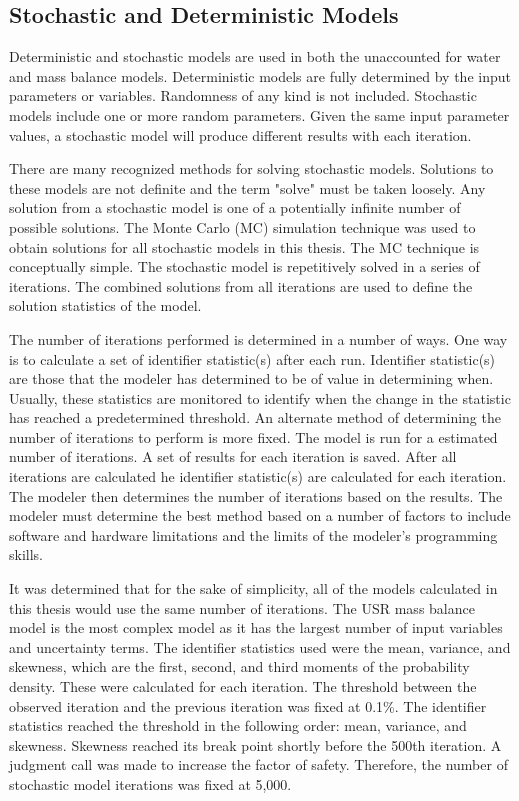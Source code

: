 \begin{linenumbers}
\clearpage{}
\section{Stochastic and Deterministic Models}
\label{sec:StochAndDetermModels}

Deterministic and stochastic models are used in both the unaccounted for water and mass balance models.  Deterministic models are fully determined by the input parameters or variables.  Randomness of any kind is not included.  Stochastic models include one or more random parameters.  Given the same input parameter values, a stochastic model will produce different results with each iteration.

There are many recognized methods for solving stochastic models.  Solutions to these models are not definite and the term "solve" must be taken loosely.  Any solution from a stochastic model is one of a potentially infinite number of possible solutions.  The Monte Carlo (MC) simulation technique was used to obtain solutions for all stochastic models in this thesis.  The MC technique is conceptually simple.  The stochastic model is repetitively solved in a series of iterations.  The combined solutions from all iterations are used to define the solution statistics of the model.  

The number of iterations performed is determined in a number of ways.  One way is to calculate a set of identifier statistic(s) after each run.  Identifier statistic(s) are those that the modeler has determined to be of value in determining when.  Usually, these statistics are monitored to identify when the change in the statistic has reached a predetermined threshold.  An alternate method of determining the number of iterations to perform is more fixed.  The model is run for a estimated number of iterations.  A set of results for each iteration is saved.  After all iterations are calculated he identifier statistic(s) are calculated for each iteration.  The modeler then determines the number of iterations based on the results.  The modeler must determine the best method based on a number of factors to include software and hardware limitations and the limits of the modeler's programming skills.

It was determined that for the sake of simplicity, all of the models calculated in this thesis would use the same number of iterations.  The USR mass balance model is the most complex model as it has the largest number of input variables and uncertainty terms.  The identifier statistics used were the mean, variance, and skewness, which are the first, second, and third moments of the probability density.  These were calculated for each iteration.  The threshold between the observed iteration and the previous iteration was fixed at 0.1\%.  The identifier statistics reached the threshold in the following order: mean, variance, and skewness.  Skewness reached its break point shortly before the 500th iteration.  A judgment call was made to increase the factor of safety.  Therefore, the number of stochastic model iterations was fixed at 5,000.  


\end{linenumbers}
